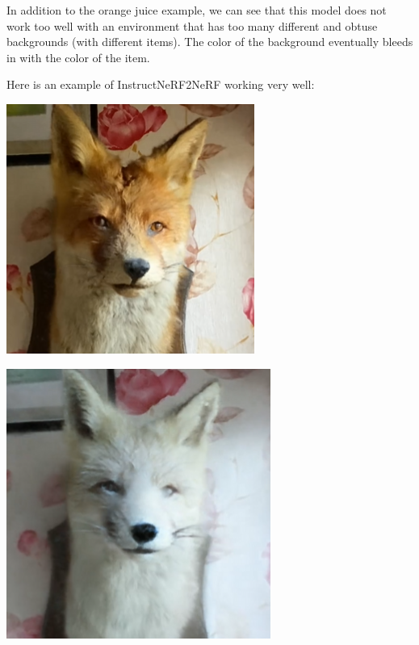 \documentclass{article}
\begin{document}
In addition to the orange juice example, we can see that this model does not work too well with an environment that has too many different and obtuse backgrounds (with different items). The color of the background eventually bleeds in with the color of the item.

\newpage
Here is an example of InstructNeRF2NeRF working very well:
\begin{center}
    \begin{tcolorbox}[
                      width=2in,
                      boxsep=0pt,
                      top=2pt,
                      left=4pt,
                      right=4pt,
                      colback=black!5!white,
                      colframe=black!75!black,
                      center title,
                      title=Original NeRF
                      ]
        \begin{center}
            \includegraphics[scale=0.4]{images/normalfox.PNG}
        \end{center}
    \end{tcolorbox}
    \begin{tcolorbox}[
                      boxsep=0pt,
                      top=2pt,
                      colback=blue!5!white,
                      colframe=blue!75!black,
                      center title,
                      autowidth title=transform the fox into an arctic fox
                      ]
        \begin{center}
            \includegraphics[scale=0.4]{images/arcticfox.PNG}

\end{center}
\end{tcolorbox}
\end{center}
\end{document}
